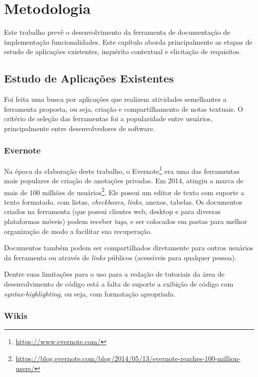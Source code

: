 \chapter{Metodologia}

Este trabalho prevê o desenvolvimento da ferramenta de documentação de implementação funcionalidades. Este capítulo aborda principalmente as etapas de estudo de aplicações existentes, inquérito contextual e elicitação de requisitos.

\section{Estudo de Aplicações Existentes}

Foi feita uma busca por aplicações que realizem atividades semelhantes a ferramenta proposta, ou seja, criação e compartilhamento de notas textuais. O critério de seleção das ferramentas foi a popularidade entre usuários, principalmente entre desenvolvedores de software.

\subsection{Evernote}

Na época da elaboração deste trabalho, o Evernote\footnote{\url{https://www.evernote.com/}} era uma das ferramentas mais populares de criação de anotações privadas. Em 2014, atingiu a marca de mais de 100 milhões de usuários\footnote{\url{https://blog.evernote.com/blog/2014/05/13/evernote-reaches-100-million-users/}}. Ele possui um editor de texto com suporte a texto formatado, com listas, \textit{checkboxes}, \textit{\textit{links}}, anexos, tabelas. Os documentos criados na ferramenta (que possui clientes web, desktop e para diversas plataformas móveis) podem receber \textit{tags}, e ser colocados em pastas para melhor organização de modo a facilitar sua recuperação.

Documentos também podem ser compartilhados diretamente para outros usuários da ferramenta ou através de \textit{links} públicos (acessíveis para qualquer pessoa).

Dentre suas limitações para o uso para a redação de tutoriais da área de desenvolvimento de código está a falta de suporte a exibição de código com \textit{syntax-highlighting}, ou seja, com formatação apropriada.

\subsection{Wikis}

